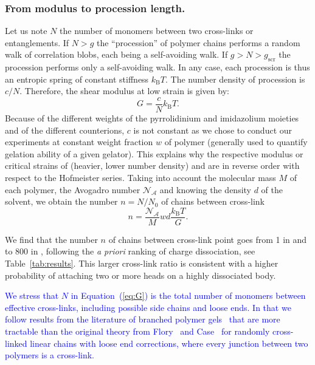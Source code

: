 \documentclass[twoside,twocolumn,9pt]{article}
\begin{document}
\subsubsection{From modulus to procession length.}

Let us note $N$ the number of monomers between two cross-links or entanglements. If $N>g$ the ``procession'' of polymer chains performs a random walk of correlation blobs, each being a self-avoiding walk. If $g>N>g_\mathrm{scr}$ the procession performs only a self-avoiding walk. In any case, each procession is thus an entropic spring of constant stiffness $k_\mathrm{B}T$. The number density of procession is $c/N$. Therefore, the shear modulus at low strain is given by:
\begin{equation}
G = \frac{c}{N}k_\mathrm{B}T.
\label{eq:G}
\end{equation}
Because of the different weights of the pyrrolidinium and imidazolium moieties and of the different counterions, $c$ is not constant as we chose to conduct our experiments at constant weight fraction $w$ of polymer (generally used to quantify gelation ability of a given gelator). This explains why the respective modulus or critical strains of  (heavier, lower number density) and  are in reverse order with respect to the Hofmeister series. Taking into account the molecular mass $M$ of each polymer, the Avogadro number $\mathcal{N_A}$ and  knowing the density $d$ of the solvent, we obtain the number $n = N/N_0$ of chains between cross-link
\begin{equation}
n = \frac{\mathcal{N_A}}{M} w d \frac{k_\mathrm{B}T}{G}.
\label{eq:n}
\end{equation}

We find that the number $n$ of chains between cross-link point goes from 1 in  and  to 800 in , following the \textit{a priori} ranking of charge dissociation, see Table~\ref{tab:results}. This larger cross-link ratio is consistent with a higher probability of attaching two or more heads on a highly dissociated body.

\textcolor{blue}{We stress that $N$ in Equation~(\ref{eq:G}) is the total number of monomers between effective cross-links, including possible side chains and loose ends. In that we follow results from the literature of branched polymer gels~\cite{Papagiannopoulos2008} that are more tractable than the original theory from Flory~\cite{Flory1944} and Case~\cite{Case1960} for randomly cross-linked linear chains with loose end corrections, where every junction between two polymers is a cross-link.}
\end{document}
